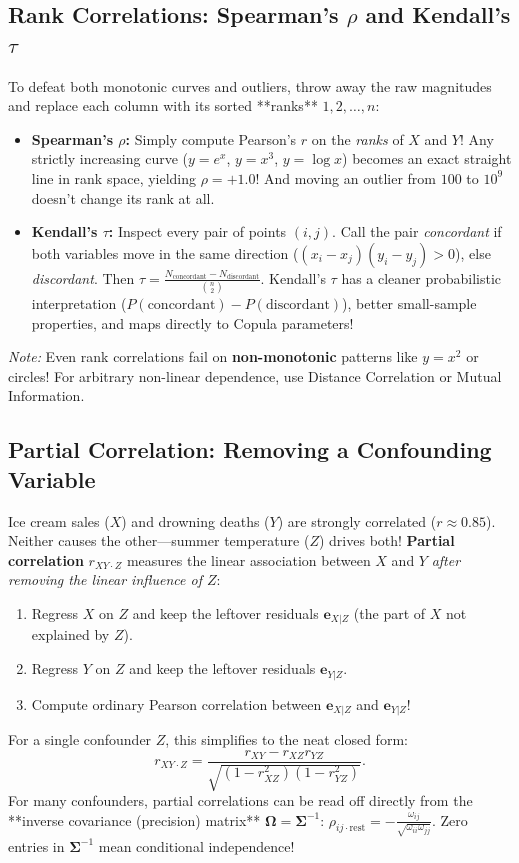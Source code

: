 \documentclass[11pt, a4paper]{article}
\begin{document}
\subsection{Rank Correlations: Spearman's $\rho$ and Kendall's $\tau$}
To defeat both monotonic curves and outliers, throw away the raw magnitudes and replace each column with its sorted **ranks** $1, 2, \dots, n$:
\begin{itemize}
    \item \textbf{Spearman's $\rho$:} Simply compute Pearson's $r$ on the \emph{ranks} of $X$ and $Y$! Any strictly increasing curve ($y = e^x$, $y = x^3$, $y = \log x$) becomes an exact straight line in rank space, yielding $\rho = +1.0$! And moving an outlier from $100$ to $10^9$ doesn't change its rank at all.
    \item \textbf{Kendall's $\tau$:} Inspect every pair of points $(i, j)$. Call the pair \emph{concordant} if both variables move in the same direction ($(x_i - x_j)(y_i - y_j) > 0$), else \emph{discordant}. Then $\tau = \frac{N_{\text{concordant}} - N_{\text{discordant}}}{\binom{n}{2}}$. Kendall's $\tau$ has a cleaner probabilistic interpretation ($P(\text{concordant}) - P(\text{discordant})$), better small-sample properties, and maps directly to Copula parameters!
\end{itemize}
\emph{Note:} Even rank correlations fail on \textbf{non-monotonic} patterns like $y = x^2$ or circles! For arbitrary non-linear dependence, use Distance Correlation or Mutual Information.

\subsection{Partial Correlation: Removing a Confounding Variable}
Ice cream sales ($X$) and drowning deaths ($Y$) are strongly correlated ($r \approx 0.85$). Neither causes the other---summer temperature ($Z$) drives both! \textbf{Partial correlation} $r_{XY \cdot Z}$ measures the linear association between $X$ and $Y$ \emph{after removing the linear influence of $Z$}:
\begin{enumerate}
    \item Regress $X$ on $Z$ and keep the leftover residuals $\mathbf{e}_{X|Z}$ (the part of $X$ not explained by $Z$).
    \item Regress $Y$ on $Z$ and keep the leftover residuals $\mathbf{e}_{Y|Z}$.
    \item Compute ordinary Pearson correlation between $\mathbf{e}_{X|Z}$ and $\mathbf{e}_{Y|Z}$!
\end{enumerate}
For a single confounder $Z$, this simplifies to the neat closed form:
\[
    r_{XY \cdot Z} = \frac{r_{XY} - r_{XZ} r_{YZ}}{\sqrt{(1 - r_{XZ}^2)(1 - r_{YZ}^2)}}.
\]
For many confounders, partial correlations can be read off directly from the **inverse covariance (precision) matrix** $\boldsymbol{\Omega} = \boldsymbol{\Sigma}^{-1}$: $\rho_{ij \cdot \text{rest}} = -\frac{\omega_{ij}}{\sqrt{\omega_{ii}\omega_{jj}}}$. Zero entries in $\boldsymbol{\Sigma}^{-1}$ mean conditional independence!
\end{document}
